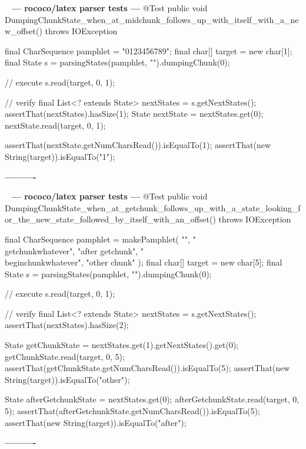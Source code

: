 \documentclass{book}
\newenvironment{chunk}[1]{%
{\ }\newline\noindent%
\hbox{\hskip 2.0cm}{\bf --- #1 ---}%
\verbatim}%                               say exactly what we see
{\endverbatim%
\par{}%
\noindent{}%
\hbox{\hskip 2.0cm}{\bf ----------}%
\par%
\normalsize\noindent}%
\providecommand{\getchunk}[1]{%
\noindent%
{\small $\backslash{}$begin\{chunk\}\{{\bf #1}\}}%
\index{{#1}}}
\begin{document}
\begin{chunk}{rococo/latex parser tests}
@Test
public void DumpingChunkState_when_at_midchunk_follows_up_with_itself_with_a_new_offset() throws IOException {
    final CharSequence pamphlet = "0123456789";
    final char[] target = new char[1];
    final State s = parsingStates(pamphlet, "").dumpingChunk(0);

    // execute
    s.read(target, 0, 1);

    // verify
    final List<? extends State> nextStates = s.getNextStates();
    assertThat(nextStates).hasSize(1);
    State nextState = nextStates.get(0);
    nextState.read(target, 0, 1);

    assertThat(nextState.getNumCharsRead()).isEqualTo(1);
    assertThat(new String(target)).isEqualTo("1");
}
\end{chunk}

\begin{chunk}{rococo/latex parser tests}
@Test
public void DumpingChunkState_when_at_getchunk_follows_up_with_a_state_looking_for_the_new_state_followed_by_itself_with_an_offset() throws IOException {
    final CharSequence pamphlet = makePamphlet(
            "",
            "\\getchunk{whatever}",
            "after getchunk",
            "\\begin{chunk}{whatever}",
            "other chunk"
    );
    final char[] target = new char[5];
    final State s = parsingStates(pamphlet, "").dumpingChunk(0);

    // execute
    s.read(target, 0, 1);

    // verify
    final List<? extends State> nextStates = s.getNextStates();
    assertThat(nextStates).hasSize(2);

    State getChunkState = nextStates.get(1).getNextStates().get(0);
    getChunkState.read(target, 0, 5);
    assertThat(getChunkState.getNumCharsRead()).isEqualTo(5);
    assertThat(new String(target)).isEqualTo("other");

    State afterGetchunkState = nextStates.get(0);
    afterGetchunkState.read(target, 0, 5);
    assertThat(afterGetchunkState.getNumCharsRead()).isEqualTo(5);
    assertThat(new String(target)).isEqualTo("after");
}
\end{chunk}
\end{document}
